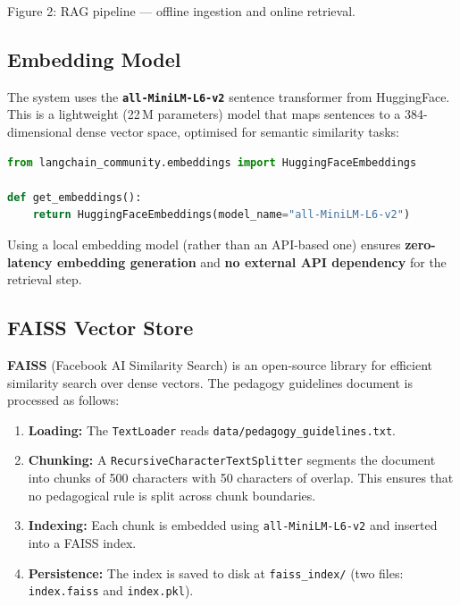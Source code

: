 \documentclass[12pt, a4paper, twoside]{article}
\newcommand{\code}[1]{\texttt{#1}}
\begin{document}
\begin{center}
\footnotesize\textcolor{muted}{Figure 2: RAG pipeline --- offline
ingestion and online retrieval.}
\end{center}

\subsection{Embedding Model}

The system uses the \textbf{\code{all-MiniLM-L6-v2}} sentence
transformer from HuggingFace. This is a lightweight (22\,M parameters)
model that maps sentences to a 384-dimensional dense vector space,
optimised for semantic similarity tasks:

\begin{lstlisting}[language=Python,
  caption={Embedding initialisation (\code{agent/rag.py}).}]
from langchain_community.embeddings import HuggingFaceEmbeddings

def get_embeddings():
    return HuggingFaceEmbeddings(model_name="all-MiniLM-L6-v2")
\end{lstlisting}

\noindent Using a local embedding model (rather than an API-based one)
ensures \textbf{zero-latency embedding generation} and
\textbf{no external API dependency} for the retrieval step.

\subsection{FAISS Vector Store}

\textbf{FAISS} (Facebook AI Similarity Search) is an open-source
library for efficient similarity search over dense vectors. The
pedagogy guidelines document is processed as follows:

\begin{enumerate}[leftmargin=2em]
    \item \textbf{Loading:} The \code{TextLoader} reads
          \code{data/pedagogy\_guidelines.txt}.
    \item \textbf{Chunking:} A \code{RecursiveCharacterTextSplitter}
          segments the document into chunks of 500 characters with 50
          characters of overlap. This ensures that no pedagogical rule
          is split across chunk boundaries.
    \item \textbf{Indexing:} Each chunk is embedded using
          \code{all-MiniLM-L6-v2} and inserted into a FAISS index.
    \item \textbf{Persistence:} The index is saved to disk at
          \code{faiss\_index/} (two files: \code{index.faiss} and
          \code{index.pkl}).
\end{enumerate}
\end{document}
